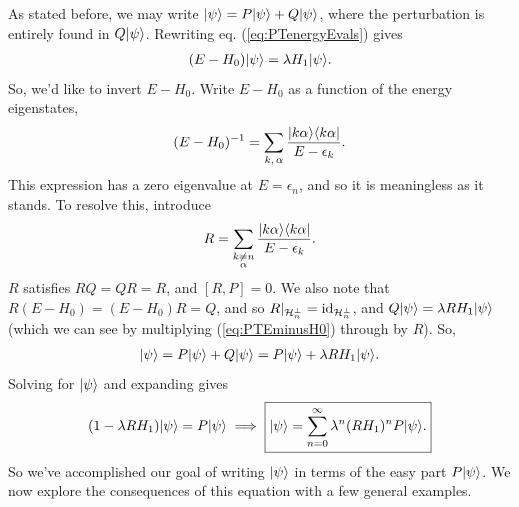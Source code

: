 \documentclass[11pt]{article}
\begin{document}
As stated before, we may write $\lvert\psi\rangle = P\lvert\psi\rangle + Q\lvert\psi\rangle$,
where the perturbation is entirely found in $Q\lvert\psi\rangle$. Rewriting eq. 
(\ref{eq:PTenergyEvals}) gives
\begin{align}
    \label{eq:PTEminusH0}
    (E - H_0)\lvert\psi\rangle = \lambda H_1 \lvert\psi\rangle.
\end{align}
So, we'd like to invert $E - H_0$. Write $E - H_0$ as a
function of the energy eigenstates,
\begin{align*}
    (E - H_0)^{-1} = \sum_{k, \, \alpha} \frac{| k\alpha \rangle \langle k\alpha |}{E - \epsilon_k}.
\end{align*}
This expression has a zero eigenvalue at $E = \epsilon_n$, and so it
is meaningless as it stands. To resolve this, introduce
\begin{align*}
    R = \sum_{\substack{k \neq n\\ \alpha}} \frac{| k\alpha \rangle \langle k\alpha |}{E - \epsilon_k}.
\end{align*}
$R$ satisfies $RQ = QR = R$, and $[R, P] = 0$. We also note that $R (E - H_0) = (E - H_0)R = Q$,
and so $R|_{\mathcal{H}_n^\perp} = \operatorname{id}_{\mathcal{H}_n^\perp}$, and $Q\lvert\psi\rangle = \lambda R H_1 \lvert\psi\rangle$
(which we can see by multiplying (\ref{eq:PTEminusH0}) through by $R$). So,
\begin{align*}
    \lvert\psi\rangle = P \lvert\psi\rangle + Q \lvert\psi\rangle = P \lvert\psi\rangle + \lambda R H_1 \lvert\psi\rangle.
\end{align*}
Solving for $\lvert\psi\rangle$ and expanding gives
\begin{align}
    \label{eq:PTstate}
    (1 - \lambda R H_1) \lvert\psi\rangle = P \lvert\psi\rangle \implies \boxed{\lvert\psi\rangle = \sum_{n = 0}^\infty \lambda^n (RH_1)^n P \lvert\psi\rangle.}
\end{align}
So we've accomplished our goal of writing $\lvert\psi\rangle$ in
terms of the easy part $P\lvert\psi\rangle$. We now explore the consequences
of this equation with a few general examples.
\end{document}
